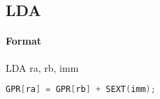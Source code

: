 \subsection{LDA}


\paragraph{Format} LDA ra, rb, imm

\begin{lstlisting}[language=C]
    GPR[ra] = GPR[rb] + SEXT(imm);
\end{lstlisting}
